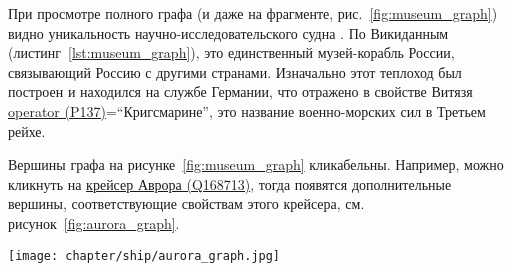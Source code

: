 При просмотре полного графа (и даже на фрагменте, рис.~\ref{fig:museum_graph}) 
видно уникальность научно-исследовательского судна . 
По Викиданным (листинг~\ref{lst:museum_graph}), 
это единственный музей-корабль России, связывающий Россию с другими странами. 
Изначально этот теплоход был построен и находился на службе Германии, 
что отражено в свойстве Витязя 
\href{https://www.wikidata.org/wiki/Property:P137}{operator (P137)}=``Кригсмарине'', 
это название военно-морских сил в Третьем рейхе.

Вершины графа на рисунке~\ref{fig:museum_graph} кликабельны. Например, можно кликнуть на \href{https://www.wikidata.org/wiki/Q168713}{крейсер Аврора (Q168713)}, тогда появятся дополнительные вершины, соответствующие свойствам этого крейсера, см. рисунок~\ref{fig:aurora_graph}.

\newpage
\begin{figure*}[h]
  \texttt{[image: chapter/ship/aurora\_graph.jpg]}
  \caption[Граф свойств Авроры]{Граф свойств \href{https://www.wikidata.org/wiki/Q168713}{крейсера Аврора (Q168713)}.}%
  \label{fig:aurora_graph}%
\end{figure*}






